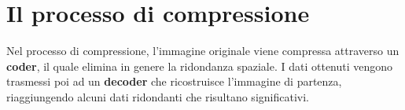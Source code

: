 \section{Il processo di compressione}
Nel processo di compressione, l'immagine originale viene compressa
attraverso un \textbf{coder}, il quale elimina in genere la ridondanza spaziale.
I dati ottenuti vengono trasmessi poi ad un \textbf{decoder} che
ricostruisce l'immagine di partenza, riaggiungendo alcuni dati ridondanti che risultano significativi.